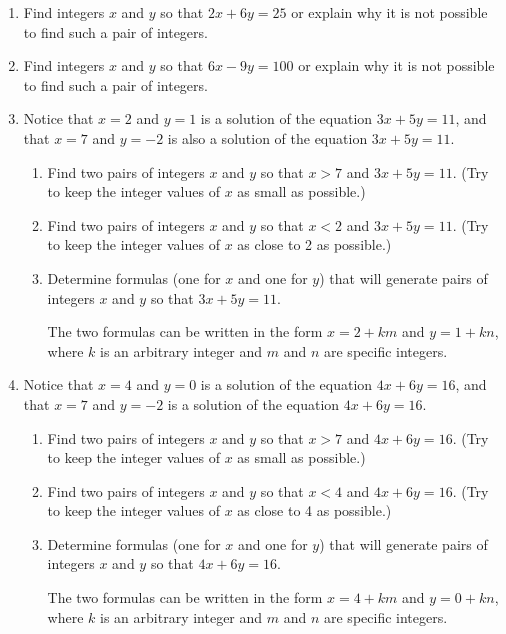 \begin{previewactivity} \label{exploringlinear} \hfill
\begin{enumerate}
\item Find integers  $x$ and $y$ so that  $2x + 6y = 25$ or explain why it is not possible to find such a pair of integers.

\item Find integers  $x$ and $y$ so that  $6x - 9y = 100$ or explain why it is not possible to find such a pair of integers.

\item Notice that $x = 2$ and $y = 1$ is a solution of the equation 
$3x + 5y = 11$, and that $x = 7$ and $y = -2$ is also a solution of the equation 
$3x + 5y = 11$.

\begin{enumerate}
  \item Find two pairs of integers $x$ and $y$ so that $x > 7$ and 
$3x + 5y = 11$.  (Try to keep the integer values of $x$ as small as possible.)

  \item Find two pairs of integers $x$ and $y$ so that $x < 2$ and 
$3x + 5y = 11$.  (Try to keep the integer values of $x$ as close to 2 as possible.)

  \item Determine formulas (one for $x$ and one for $y$)  that will generate pairs of integers $x$ and $y$ so that $3x + 5y = 11$.

\hint  The two formulas can be written in the form $x = 2 + km$ and $y = 1 + kn$, where $k$ is an arbitrary integer and $m$ and $n$ are specific integers. 

\end{enumerate}

\item Notice that $x = 4$ and $y = 0$ is a solution of the equation $4x + 6y = 16$, and that 
$x = 7$ and $y = -2$ is a solution of the equation $4x + 6y = 16$.

\begin{enumerate}
  \item Find two pairs of integers $x$ and $y$ so that $x > 7$ and 
$4x + 6y = 16$.  (Try to keep the integer values of $x$ as small as possible.)

  \item Find two pairs of integers $x$ and $y$ so that $x < 4$ and 
$4x + 6y = 16$.  (Try to keep the integer values of $x$ as close to 4 as possible.)

  \item Determine formulas (one for $x$ and one for $y$)  that will generate pairs of integers $x$ and $y$ so that $4x + 6y = 16$.

\hint  The two formulas can be written in the form $x = 4 + km$ and $y = 0 + kn$, where $k$ is an arbitrary integer and $m$ and $n$ are specific integers. 
\end{enumerate}
\end{enumerate}
\end{previewactivity}
\hbreak


\endinput
